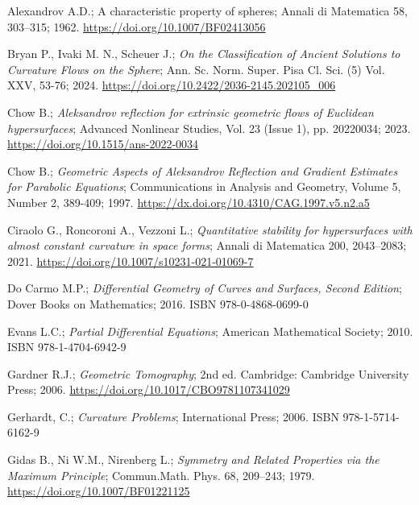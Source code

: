 \documentclass[a4paper, 12pt]{book}
\begin{document}
{}
\begin{thebibliography}{21} 
	 Alexandrov A.D.; {A characteristic property of spheres}; Annali di Matematica 58, 303–315; 1962. \href{https://doi.org/10.1007/BF02413056}{https://doi.org/10.1007/BF02413056}
	
	 Bryan P., Ivaki M. N., Scheuer J.; {\em On the Classification of Ancient Solutions to Curvature Flows on the Sphere}; Ann. Sc. Norm. Super. Pisa Cl. Sci. (5)
	Vol. XXV, 53-76; 2024. \href{https://doi.org/10.2422/2036-2145.202105_006}{https://doi.org/10.2422/2036-2145.202105\_006} 
	
	 Chow B.; {\em Aleksandrov reflection for extrinsic geometric flows of Euclidean hypersurfaces}; Advanced Nonlinear Studies, Vol. 23 (Issue 1), pp. 20220034; 2023. \href{https://doi.org/10.1515/ans-2022-0034}{https://doi.org/10.1515/ans-2022-0034}
	
	 Chow B.; {\em Geometric Aspects of Aleksandrov Reflection and Gradient Estimates for Parabolic Equations}; Communications in Analysis and Geometry, Volume 5, Number 2, 389-409; 1997. \href{https://dx.doi.org/10.4310/CAG.1997.v5.n2.a5}{https://dx.doi.org/10.4310/CAG.1997.v5.n2.a5}
	
	 Ciraolo G., Roncoroni A., Vezzoni L.;  {\em Quantitative stability for hypersurfaces with almost constant curvature in space forms}; Annali di Matematica 200, 2043–2083; 2021. \href{https://doi.org/10.1007/s10231-021-01069-7}{https://doi.org/10.1007/s10231-021-01069-7}
	
	 Do Carmo M.P.; {\em Differential Geometry of Curves and Surfaces, Second Edition};  Dover Books on Mathematics; 2016. ISBN 978-0-4868-0699-0
	
	 Evans L.C.; {\em Partial Differential Equations};  American Mathematical Society; 2010. ISBN 978-1-4704-6942-9
	
	 Gardner R.J.; {\em Geometric Tomography}; 2nd ed. Cambridge: Cambridge University Press; 2006. \href{https://doi.org/10.1017/CBO9781107341029}{https://doi.org/10.1017/CBO9781107341029}
	
	 Gerhardt, C.; {\em Curvature Problems}; International Press; 2006. ISBN 978-1-5714-6162-9
	
	 Gidas B., Ni W.M., Nirenberg L.; {\em Symmetry and Related Properties via the Maximum Principle};  Commun.Math. Phys. 68, 209–243; 1979. \href{https://doi.org/10.1007/BF01221125}{https://doi.org/10.1007/BF01221125}
	

\end{thebibliography}
\end{document}
